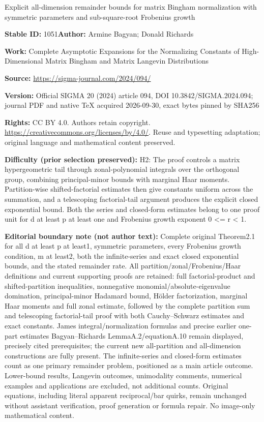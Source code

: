 \documentclass[11pt]{article}
\numberwithin{equation}{section}
\numberwithin{equation}{section}
\begin{document}
\begin{center}\Large Explicit all-dimension remainder bounds for matrix Bingham normalization with symmetric parameters and sub-square-root Frobenius growth\end{center}
\noindent\textbf{Stable ID:} 1051\quad\textbf{Author:} Armine Bagyan; Donald Richards\par
\noindent\textbf{Work:} Complete Asymptotic Expansions for the Normalizing Constants of High-Dimensional Matrix Bingham and Matrix Langevin Distributions\par
\noindent\textbf{Source:} \url{https://sigma-journal.com/2024/094/}\par
\noindent\textbf{Version:} Official SIGMA 20 (2024) article 094, DOI 10.3842/SIGMA.2024.094; journal PDF and native TeX acquired 2026-09-30, exact bytes pinned by SHA256\par
\noindent\textbf{Rights:} CC BY 4.0. Authors retain copyright. \url{https://creativecommons.org/licenses/by/4.0/}. Reuse and typesetting adaptation; original language and mathematical content preserved.\par
\noindent\textbf{Difficulty (prior selection preserved):} {\CJKfont H2: The proof controls a matrix hypergeometric tail through zonal-polynomial integrals over the orthogonal group, combining principal-minor bounds with marginal Haar moments. Partition-wise shifted-factorial estimates then give constants uniform across the summation, and a telescoping factorial-tail argument produces the explicit closed exponential bound. Both the series and closed-form estimates belong to one proof unit for d at least p at least one and Frobenius growth exponent 0 <= r < 1.}\par
\medskip\noindent\textbf{Editorial boundary note (not author text):} Complete original Theorem2.1 for all d at least p at least1, symmetric parameters, every Frobenius growth condition, m at least2, both the infinite-series and exact closed exponential bounds, and the stated remainder rate. All partition/zonal/Frobenius/Haar definitions and current supporting proofs are retained: full factorial-product and shifted-partition inequalities, nonnegative monomial/absolute-eigenvalue domination, principal-minor Hadamard bound, Hölder factorization, marginal Haar moments and full zonal estimate, followed by the complete partition sum and telescoping factorial-tail proof with both Cauchy–Schwarz estimates and exact constants. James integral/normalization formulas and precise earlier one-part estimates Bagyan–Richards LemmaA.2/equationA.10 remain displayed, precisely cited prerequisites; the current new all-partition and all-dimension constructions are fully present. The infinite-series and closed-form estimates count as one primary remainder problem, positioned as a main article outcome. Lower-bound results, Langevin outcomes, unimodality comments, numerical examples and applications are excluded, not additional counts. Original equations, including literal apparent reciprocal/bar quirks, remain unchanged without assistant verification, proof generation or formula repair. No image-only mathematical content.\par
\end{document}
